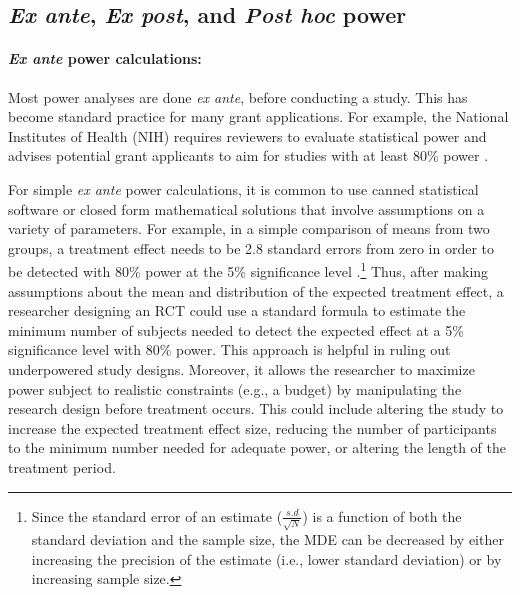 \documentclass[12pt]{article}%
\begin{document}
\subsection{\emph{Ex ante}, \emph{Ex post}, and \emph{Post hoc} power}

\paragraph{\emph{Ex ante} power calculations: }
Most power analyses are done \emph{ex ante}, before conducting a study. 
This has become standard practice for many grant applications. 
For example, the National Institutes of Health (NIH) requires reviewers to evaluate statistical power and advises potential grant applicants to aim for studies with at least 80\% power \citep{Review2016,Gerin2017}.


For simple \emph{ex ante} power calculations, it is common to use canned statistical software or closed form mathematical solutions that involve assumptions on a variety of parameters. 
For example, in a simple comparison of means from two groups, a treatment effect needs to be 2.8 standard errors from zero in order to be detected with 80\% power at the 5\% significance level \citep{Gelman2006}.\footnote{Since the standard error of an estimate ($\frac{s.d}{\sqrt{N}}$) is a function of both the standard deviation and the sample size, the MDE can be decreased by either increasing the precision of the estimate (i.e., lower standard deviation) or by increasing sample size.}
Thus, after making assumptions about the mean and distribution of the expected treatment effect, a researcher designing an RCT could use a standard formula to estimate the minimum number of subjects needed to detect the expected effect at a 5\% significance level with 80\% power. 
This approach is helpful in ruling out underpowered study designs. 
Moreover, it allows the researcher to maximize power subject to realistic constraints (e.g., a budget) by manipulating the research design before treatment occurs. 
This could include altering the study to increase the expected treatment effect size, reducing the number of participants to the minimum number needed for adequate power, or altering the length of the treatment period. 
\end{document}

